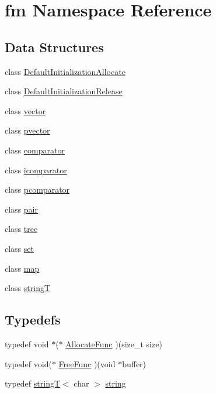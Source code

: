 \hypertarget{namespacefm}{
\section{fm Namespace Reference}
\label{namespacefm}
}
\subsection*{Data Structures}
\begin{DoxyCompactItemize}
\item 
class \hyperlink{classfm_1_1DefaultInitializationAllocate}{DefaultInitializationAllocate}
\item 
class \hyperlink{classfm_1_1DefaultInitializationRelease}{DefaultInitializationRelease}
\item 
class \hyperlink{classfm_1_1vector}{vector}
\item 
class \hyperlink{classfm_1_1pvector}{pvector}
\item 
class \hyperlink{classfm_1_1comparator}{comparator}
\item 
class \hyperlink{classfm_1_1icomparator}{icomparator}
\item 
class \hyperlink{classfm_1_1pcomparator}{pcomparator}
\item 
class \hyperlink{classfm_1_1pair}{pair}
\item 
class \hyperlink{classfm_1_1tree}{tree}
\item 
class \hyperlink{classfm_1_1set}{set}
\item 
class \hyperlink{classfm_1_1map}{map}
\item 
class \hyperlink{classfm_1_1stringT}{stringT}
\end{DoxyCompactItemize}
\subsection*{Typedefs}
\begin{DoxyCompactItemize}
\item 
typedef void $\ast$($\ast$ \hyperlink{namespacefm_a97324e93febfca76d5ed574a89c0197d}{AllocateFunc} )(size\_\-t size)
\item 
typedef void($\ast$ \hyperlink{namespacefm_a9b240a6540d27367231e6fd6d93ec35c}{FreeFunc} )(void $\ast$buffer)
\item 
typedef \hyperlink{classfm_1_1stringT}{stringT}$<$ char $>$ \hyperlink{namespacefm_ac112eb8f56d62ea729aa6d1edd7233a4}{string}
\end{DoxyCompactItemize}
